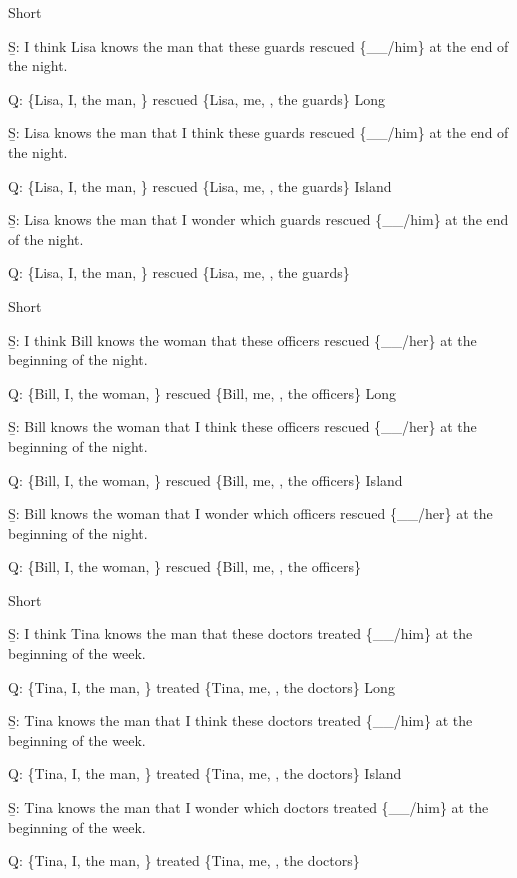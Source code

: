 \pex 
\a Short\par\nobreak
\beginsubsub 
\b{S:} I think Lisa knows the man that these guards rescued \{\_\_/him\} at the end of the night.\par\nobreak
\b{Q:} \{Lisa, I, the man, \} rescued \{Lisa, me, , the guards\}
\endsubsub
\a Long\par\nobreak
\beginsubsub
\b{S:} Lisa knows the man that I think these guards rescued \{\_\_/him\} at the end of the night.\par\nobreak
\b{Q:} \{Lisa, I, the man, \} rescued \{Lisa, me, , the guards\}
\endsubsub
\a Island\par\nobreak
\beginsubsub
\b{S:} Lisa knows the man that I wonder which guards rescued \{\_\_/him\} at the end of the night.\par\nobreak
\b{Q:} \{Lisa, I, the man, \} rescued \{Lisa, me, , the guards\}
\endsubsub
\xe

\pex 
\a Short\par\nobreak
\beginsubsub 
\b{S:} I think Bill knows the woman that these officers rescued \{\_\_/her\} at the beginning of the night.\par\nobreak
\b{Q:} \{Bill, I, the woman, \} rescued \{Bill, me, , the officers\}
\endsubsub
\a Long\par\nobreak
\beginsubsub
\b{S:} Bill knows the woman that I think these officers rescued \{\_\_/her\} at the beginning of the night.\par\nobreak
\b{Q:} \{Bill, I, the woman, \} rescued \{Bill, me, , the officers\}
\endsubsub
\a Island\par\nobreak
\beginsubsub
\b{S:} Bill knows the woman that I wonder which officers rescued \{\_\_/her\} at the beginning of the night.\par\nobreak
\b{Q:} \{Bill, I, the woman, \} rescued \{Bill, me, , the officers\}
\endsubsub
\xe

\pex 
\a Short\par\nobreak
\beginsubsub 
\b{S:} I think Tina knows the man that these doctors treated \{\_\_/him\} at the beginning of the week.\par\nobreak
\b{Q:} \{Tina, I, the man, \} treated \{Tina, me, , the doctors\}
\endsubsub
\a Long\par\nobreak
\beginsubsub
\b{S:} Tina knows the man that I think these doctors treated \{\_\_/him\} at the beginning of the week.\par\nobreak
\b{Q:} \{Tina, I, the man, \} treated \{Tina, me, , the doctors\}
\endsubsub
\a Island\par\nobreak
\beginsubsub
\b{S:} Tina knows the man that I wonder which doctors treated \{\_\_/him\} at the beginning of the week.\par\nobreak
\b{Q:} \{Tina, I, the man, \} treated \{Tina, me, , the doctors\}
\endsubsub
\xe

